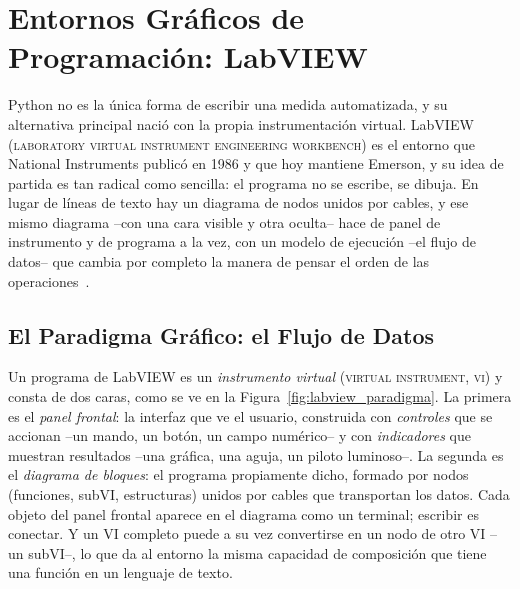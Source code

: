 
\section{Entornos Gráficos de Programación: LabVIEW}\label{sec:labview}

Python no es la única forma de escribir una medida automatizada, y su alternativa principal nació con la propia instrumentación virtual. LabVIEW (\textsc{laboratory virtual instrument engineering workbench}) es el entorno que National Instruments publicó en 1986 y que hoy mantiene Emerson, y su idea de partida es tan radical como sencilla: el programa no se escribe, se dibuja. En lugar de líneas de texto hay un diagrama de nodos unidos por cables, y ese mismo diagrama --con una cara visible y otra oculta-- hace de panel de instrumento y de programa a la vez, con un modelo de ejecución --el flujo de datos-- que cambia por completo la manera de pensar el orden de las operaciones~\cite{kodosky2020labview,johnson2006labview}.

\subsection{El Paradigma Gráfico: el Flujo de Datos}\label{sub:paradigma_grafico}

Un programa de LabVIEW es un \emph{instrumento virtual} (\textsc{virtual instrument, vi}) y consta de dos caras, como se ve en la Figura~\ref{fig:labview_paradigma}. La primera es el \emph{panel frontal}: la interfaz que ve el usuario, construida con \emph{controles} que se accionan --un mando, un botón, un campo numérico-- y con \emph{indicadores} que muestran resultados --una gráfica, una aguja, un piloto luminoso--. La segunda es el \emph{diagrama de bloques}: el programa propiamente dicho, formado por nodos (funciones, subVI, estructuras) unidos por cables que transportan los datos. Cada objeto del panel frontal aparece en el diagrama como un terminal; escribir es conectar. Y un VI completo puede a su vez convertirse en un nodo de otro VI --un subVI--, lo que da al entorno la misma capacidad de composición que tiene una función en un lenguaje de texto.

